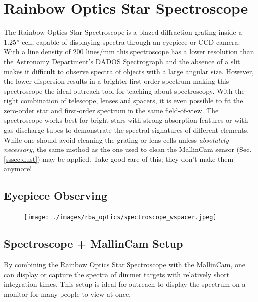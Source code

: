 \documentclass[12pt,titlepage]{article}
\begin{document}
\section{Rainbow Optics Star Spectroscope}
The Rainbow Optics Star Spectroscope is a blazed diffraction grating inside a 1.25'' cell,
capable of displaying spectra through an eyepiece or CCD camera.
With a line density of 200 lines/mm \cite{hopkins_spec} this spectroscope has a lower resolution than the Astronomy
Department's DADOS Spectrograph and the absence of a slit makes it difficult to observe spectra
of objects with a large angular size. However, the lower dispersion results in a brighter
first-order spectrum making this spectroscope the ideal outreach tool for teaching about spectroscopy.
With the right combination of telescope, lenses and spacers, it is even possible to fit the zero-order star
and first-order spectrum in the same field-of-view. The spectroscope works best for bright stars with strong
absorption features or with gas discharge tubes to demonstrate the spectral signatures of different elements. 
While one should avoid cleaning the grating or lens cells unless \textit{absolutely necessary},
the same method as the one used to clean the MallinCam sensor (Sec. \ref{sssec:dust}) may be applied.
Take good care of this; they don't make them anymore!


\subsection{Eyepiece Observing}
\begin{figure}[H] 
	\begin{center}
		\texttt{[image: ./images/rbw\_optics/spectroscope\_wspacer.jpeg]} 
		\caption{}
		\label{mfr5}
	\end{center}
\end{figure}


\subsection{Spectroscope + MallinCam Setup}
By combining the Rainbow Optics Star Spectroscope with the MallinCam, one can display or capture
the spectra of dimmer targets with relatively short integration times.
This setup is ideal for outreach to display the spectrum on a monitor for many people to view at once.
\end{document}
